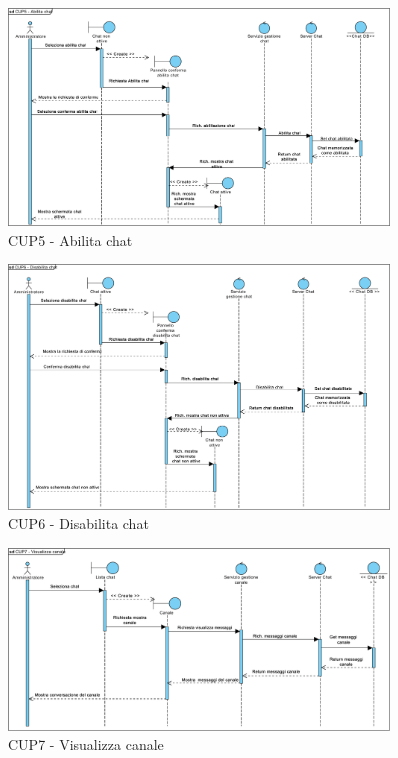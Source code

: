 \begin{figure}
	\centering
	\includegraphics[width=0.9\textwidth]{imgs/gruppo6/sequence/CUP5_abilita_chat.pdf}
	\caption{CUP5 - Abilita chat}
	\label{fig:seq-cup5}
\end{figure}

\begin{figure}
	\centering
	\includegraphics[width=0.9\textwidth]{imgs/gruppo6/sequence/CUP6_disabilita_chat.pdf}
	\caption{CUP6 - Disabilita chat}
	\label{fig:seq-cup6}
\end{figure}

\begin{figure}
	\centering
	\includegraphics[width=0.9\textwidth]{imgs/gruppo6/sequence/CUP7_visualizza_canale.pdf}
	\caption{CUP7 - Visualizza canale}
	\label{fig:seq-cup7}
\end{figure}

